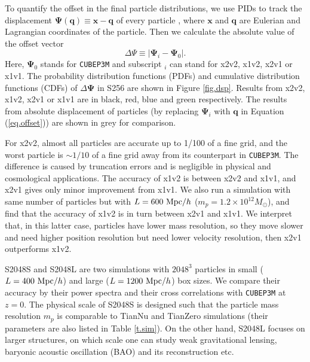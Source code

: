 \documentclass[10pt,twocolumn,preprint]{emulateapj}
\newcommand{\bs}{\boldsymbol}
\newcommand{\Msun}{M_\odot}
\begin{document}
To quantify the offset in the final particle distributions, we use PIDs to track the displacement ${\bs \Psi}({\bs q})\equiv{\bs x}-{\bs q}$ of every particle \citep{2017PhRvD..95d3501Y}, where ${\bs x}$ and ${\bs q}$ are Eulerian and Lagrangian coordinates of the particle. Then we calculate the absolute value of the offset vector
\begin{equation}\label{eq.offset}
	\Delta\Psi\equiv|{\bs\Psi}_i-{\bs\Psi}_0|.
\end{equation}
Here, ${\bs\Psi}_0$ stands for {\tt CUBEP3M} and subscript $_i$ can stand for x2v2, x1v2, x2v1 or x1v1. The probability distribution functions (PDFs) and cumulative distribution functions (CDFs) of $\Delta\bs\Psi$ in S256 are shown in Figure \ref{fig.dsp}. Results from x2v2, x1v2, x2v1 or x1v1 are in black, red, blue and green respectively. The results from absolute displacement of particles (by replacing ${\bs\Psi}_i$ with ${\bs q}$ in Equation (\ref{eq.offset})) are shown in grey for comparison.

For x2v2, almost all particles are accurate up to 1/100 of a fine grid, and the worst particle is $\sim 1/10$ of a fine grid away from its counterpart in {\tt CUBEP3M}. The difference is caused by truncation errors and is negligible in physical and cosmological applications. The accuracy of x1v2 is between x2v2 and x1v1, and x2v1 gives only minor improvement from x1v1. We also run a simulation with same number of particles but with $L=600\ {\rm Mpc}/h$ ($m_p=1.2\times 10^{12}\Msun$), and find that the accuracy of x1v2 is in turn between x2v1 and x1v1. We interpret that, in this latter case, particles have lower mass resolution, so they move slower and need higher position resolution but need lower velocity resolution, then x2v1 outperforms x1v2.

S2048S and S2048L are two simulations with $2048^3$ particles in small ($L=400\ {\rm Mpc}/h$) and large ($L=1200\ {\rm Mpc}/h$) box sizes. We compare their accuracy by their power spectra and their cross correlations with {\tt CUBEP3M} at $z=0$. The physical scale of S2048S is designed such that the particle mass resolution $m_p$ is comparable to TianNu and TianZero simulations (their parameters are also listed in Table \ref{t.sim}). On the other hand, S2048L focuses on larger structures, on which scale one can study weak gravitational lensing, baryonic acoustic oscillation (BAO) \citep{2005ApJ...633..560E} and its reconstruction \citep{2007ApJ...664..675E,2017ApJ...841L..29W} etc.
\end{document}
